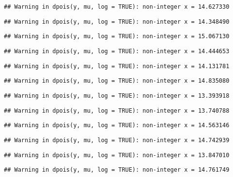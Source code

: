 \documentclass[
]{article}
\begin{document}
\begin{verbatim}
## Warning in dpois(y, mu, log = TRUE): non-integer x = 14.627330
\end{verbatim}

\begin{verbatim}
## Warning in dpois(y, mu, log = TRUE): non-integer x = 14.348490
\end{verbatim}

\begin{verbatim}
## Warning in dpois(y, mu, log = TRUE): non-integer x = 15.067130
\end{verbatim}

\begin{verbatim}
## Warning in dpois(y, mu, log = TRUE): non-integer x = 14.444653
\end{verbatim}

\begin{verbatim}
## Warning in dpois(y, mu, log = TRUE): non-integer x = 14.131781
\end{verbatim}

\begin{verbatim}
## Warning in dpois(y, mu, log = TRUE): non-integer x = 14.835080
\end{verbatim}

\begin{verbatim}
## Warning in dpois(y, mu, log = TRUE): non-integer x = 13.393918
\end{verbatim}

\begin{verbatim}
## Warning in dpois(y, mu, log = TRUE): non-integer x = 13.740788
\end{verbatim}

\begin{verbatim}
## Warning in dpois(y, mu, log = TRUE): non-integer x = 14.563146
\end{verbatim}

\begin{verbatim}
## Warning in dpois(y, mu, log = TRUE): non-integer x = 14.742939
\end{verbatim}

\begin{verbatim}
## Warning in dpois(y, mu, log = TRUE): non-integer x = 13.847010
\end{verbatim}

\begin{verbatim}
## Warning in dpois(y, mu, log = TRUE): non-integer x = 14.761749
\end{verbatim}
\end{document}
